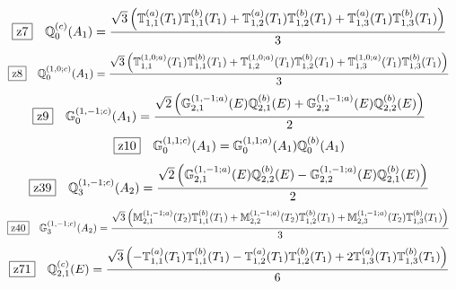 \documentclass[fleqn,10pt,landscape]{jsarticle}
\begin{document}
\begin{dmath*}
\hspace*{3mm}\fbox{z7}\quad \mathbb{Q}_{0}^{(c)}(A_{1})=\frac{\sqrt{3} \left(\mathbb{T}_{1,1}^{(a)}(T_{1}) \mathbb{T}_{1,1}^{(b)}(T_{1}) + \mathbb{T}_{1,2}^{(a)}(T_{1}) \mathbb{T}_{1,2}^{(b)}(T_{1}) + \mathbb{T}_{1,3}^{(a)}(T_{1}) \mathbb{T}_{1,3}^{(b)}(T_{1})\right)}{3}
\end{dmath*}
\begin{dmath*}
\hspace*{3mm}\fbox{z8}\quad \mathbb{Q}_{0}^{(1,0;c)}(A_{1})=\frac{\sqrt{3} \left(\mathbb{T}_{1,1}^{(1,0;a)}(T_{1}) \mathbb{T}_{1,1}^{(b)}(T_{1}) + \mathbb{T}_{1,2}^{(1,0;a)}(T_{1}) \mathbb{T}_{1,2}^{(b)}(T_{1}) + \mathbb{T}_{1,3}^{(1,0;a)}(T_{1}) \mathbb{T}_{1,3}^{(b)}(T_{1})\right)}{3}
\end{dmath*}
\begin{dmath*}
\hspace*{3mm}\fbox{z9}\quad \mathbb{G}_{0}^{(1,-1;c)}(A_{1})=\frac{\sqrt{2} \left(\mathbb{G}_{2,1}^{(1,-1;a)}(E) \mathbb{Q}_{2,1}^{(b)}(E) + \mathbb{G}_{2,2}^{(1,-1;a)}(E) \mathbb{Q}_{2,2}^{(b)}(E)\right)}{2}
\end{dmath*}
\begin{dmath*}
\hspace*{3mm}\fbox{z10}\quad \mathbb{G}_{0}^{(1,1;c)}(A_{1})=\mathbb{G}_{0}^{(1,1;a)}(A_{1}) \mathbb{Q}_{0}^{(b)}(A_{1})
\end{dmath*}
\begin{dmath*}
\hspace*{3mm}\fbox{z39}\quad \mathbb{Q}_{3}^{(1,-1;c)}(A_{2})=\frac{\sqrt{2} \left(\mathbb{G}_{2,1}^{(1,-1;a)}(E) \mathbb{Q}_{2,2}^{(b)}(E) - \mathbb{G}_{2,2}^{(1,-1;a)}(E) \mathbb{Q}_{2,1}^{(b)}(E)\right)}{2}
\end{dmath*}
\begin{dmath*}
\hspace*{3mm}\fbox{z40}\quad \mathbb{G}_{3}^{(1,-1;c)}(A_{2})=\frac{\sqrt{3} \left(\mathbb{M}_{2,1}^{(1,-1;a)}(T_{2}) \mathbb{T}_{1,1}^{(b)}(T_{1}) + \mathbb{M}_{2,2}^{(1,-1;a)}(T_{2}) \mathbb{T}_{1,2}^{(b)}(T_{1}) + \mathbb{M}_{2,3}^{(1,-1;a)}(T_{2}) \mathbb{T}_{1,3}^{(b)}(T_{1})\right)}{3}
\end{dmath*}
\begin{dmath*}
\hspace*{3mm}\fbox{z71}\quad \mathbb{Q}_{2,1}^{(c)}(E)=\frac{\sqrt{3} \left(- \mathbb{T}_{1,1}^{(a)}(T_{1}) \mathbb{T}_{1,1}^{(b)}(T_{1}) - \mathbb{T}_{1,2}^{(a)}(T_{1}) \mathbb{T}_{1,2}^{(b)}(T_{1}) + 2 \mathbb{T}_{1,3}^{(a)}(T_{1}) \mathbb{T}_{1,3}^{(b)}(T_{1})\right)}{6}
\end{dmath*}
\end{document}

